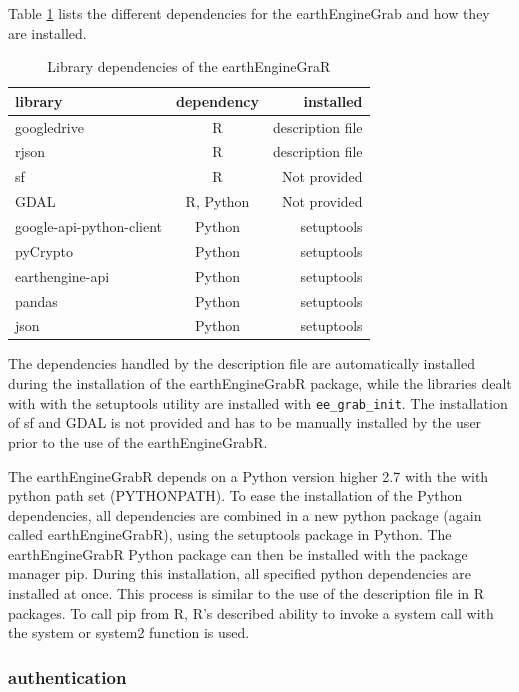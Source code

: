 Table \ref*{dependencies} lists the different dependencies for the earthEngineGrab and how they are installed. 

\begin{table}[h]
	\begin{tabularx}{\textwidth}{l|c|r}
		\hline
		\textbf{library} & \textbf{dependency} & \textbf{installed}  \\
		\hline
		googledrive & R  & description file  \\
		rjson & R  & description file  \\
		sf & R  & Not provided  \\
		GDAL & R, Python  & Not provided  \\
		google-api-python-client & Python  & setuptools  \\
		pyCrypto & Python  & setuptools  \\
		earthengine-api & Python  & setuptools  \\        
		pandas & Python  & setuptools  \\        
		json & Python  & setuptools  \\        
		\hline
	\end{tabularx}
	\caption{Library dependencies of the earthEngineGraR}
	\label{dependencies}
\end{table}

The dependencies handled by the description file are automatically installed during the installation of the earthEngineGrabR package, while the libraries dealt with with the setuptools utility are installed with \texttt{ee\_grab\_init}. The installation of sf and GDAL is not provided and has to be manually installed by the user prior to the use of the earthEngineGrabR.

The earthEngineGrabR depends on a Python version higher 2.7 with the with python path set (PYTHONPATH). To ease the installation of the Python dependencies, all dependencies are combined in a new python package (again called earthEngineGrabR), using the setuptools package in Python. The earthEngineGrabR Python package can then be installed with the package manager pip. During this installation, all specified python dependencies are installed at once. This process is similar to the use of the description file in R packages. To call pip from R, R's described ability to invoke a system call with the system or system2 function is used.

\subsubsection{authentication}


